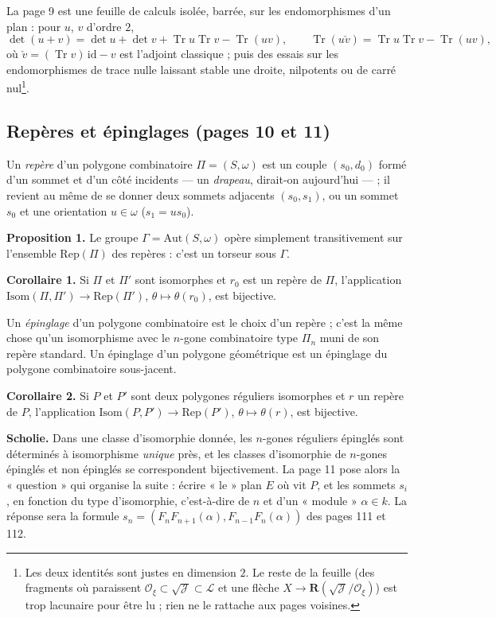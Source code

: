 \documentclass[11pt,a4paper]{article}
\begin{document}
La page 9 est une feuille de calculs isolée, barrée, sur les endomorphismes
d'un plan : pour $u$, $v$ d'ordre $2$,
\[
  \det(u + v) = \det u + \det v + \operatorname{Tr} u \operatorname{Tr} v -
  \operatorname{Tr}(uv), \qquad
  \operatorname{Tr}(u \check v) = \operatorname{Tr} u \operatorname{Tr} v -
  \operatorname{Tr}(uv),
\]
où $\check v = (\operatorname{Tr} v)\,\mathrm{id} - v$ est l'adjoint
classique ; puis des essais sur les endomorphismes de trace nulle laissant
stable une droite, nilpotents ou de carré nul\footnote{Les deux identités sont
justes en dimension $2$. Le reste de la feuille (des fragments où paraissent
$\mathcal{O}_\xi \subset \sqrt{\mathcal{J}} \subset \mathcal{L}$ et une
flèche $X \to \mathbf{R}(\sqrt{\mathcal{J}}/\mathcal{O}_\xi)$) est trop
lacunaire pour être lu ; rien ne le rattache aux pages voisines.}.

\subsection*{Repères et épinglages (pages 10 et 11)}

Un \emph{repère} d'un polygone combinatoire $\Pi = (S, \omega)$ est un couple
$(s_0, d_0)$ formé d'un sommet et d'un côté incidents --- un \emph{drapeau},
dirait-on aujourd'hui --- ; il revient au même de se donner deux sommets
adjacents $(s_0, s_1)$, ou un sommet $s_0$ et une orientation $u \in \omega$
($s_1 = u s_0$).

\textbf{Proposition 1.} Le groupe $\Gamma = \mathrm{Aut}(S, \omega)$ opère
simplement transitivement sur l'ensemble $\mathrm{Rep}(\Pi)$ des repères :
c'est un torseur sous $\Gamma$.

\textbf{Corollaire 1.} Si $\Pi$ et $\Pi'$ sont isomorphes et $r_0$ est un
repère de $\Pi$, l'application $\mathrm{Isom}(\Pi, \Pi') \to
\mathrm{Rep}(\Pi')$, $\theta \mapsto \theta(r_0)$, est bijective.

Un \emph{épinglage} d'un polygone combinatoire est le choix d'un repère ;
c'est la même chose qu'un isomorphisme avec le $n$-gone combinatoire type
$\Pi_n$ muni de son repère standard. Un épinglage d'un polygone géométrique
est un épinglage du polygone combinatoire sous-jacent.

\textbf{Corollaire 2.} Si $P$ et $P'$ sont deux polygones réguliers
isomorphes et $r$ un repère de $P$, l'application $\mathrm{Isom}(P, P') \to
\mathrm{Rep}(P')$, $\theta \mapsto \theta(r)$, est bijective.

\textbf{Scholie.} Dans une classe d'isomorphie donnée, les $n$-gones réguliers
épinglés sont déterminés à isomorphisme \emph{unique} près, et les classes
d'isomorphie de $n$-gones épinglés et non épinglés se correspondent
bijectivement. La page 11 pose alors la « question » qui organise la suite :
écrire « le » plan $E$ où vit $P$, et les sommets $s_i$, en fonction du type
d'isomorphie, c'est-à-dire de $n$ et d'un « module » $\alpha \in k$. La
réponse sera la formule $s_n = (F_n F_{n+1}(\alpha), F_{n-1} F_n(\alpha))$
des pages 111 et 112.
\end{document}
